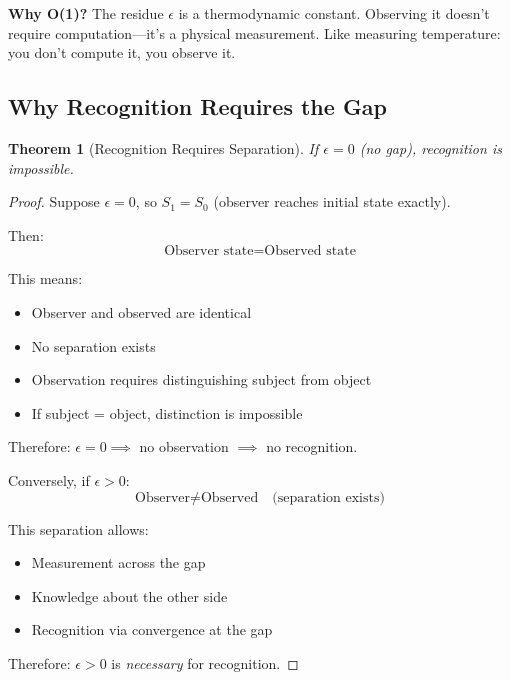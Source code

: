 \documentclass[twocolumn,10pt]{article}
\newtheorem{theorem}{Theorem}[section]
\theoremstyle{definition}
\theoremstyle{remark}
\begin{document}
\vspace{0.2cm}
\noindent\textbf{Why O(1)?} The residue $\epsilon$ is a thermodynamic constant. Observing it doesn't require computation—it's a physical measurement. Like measuring temperature: you don't compute it, you observe it.

\subsection{Why Recognition Requires the Gap}

\begin{theorem}[Recognition Requires Separation]
\label{thm:separation}
If $\epsilon = 0$ (no gap), recognition is impossible.
\end{theorem}

\begin{proof}
Suppose $\epsilon = 0$, so $S_1 = S_0$ (observer reaches initial state exactly).

Then:
\begin{equation}
\text{Observer state} = \text{Observed state}
\end{equation}

This means:
\begin{itemize}
\item Observer and observed are identical
\item No separation exists
\item Observation requires distinguishing subject from object
\item If subject = object, distinction is impossible
\end{itemize}

Therefore: $\epsilon = 0 \implies$ no observation $\implies$ no recognition.

\vspace{0.2cm}
\noindent Conversely, if $\epsilon > 0$:
\begin{equation}
\text{Observer} \neq \text{Observed} \quad \text{(separation exists)}
\end{equation}

This separation allows:
\begin{itemize}
\item Measurement across the gap
\item Knowledge about the other side
\item Recognition via convergence at the gap
\end{itemize}

Therefore: $\epsilon > 0$ is \textit{necessary} for recognition.
\end{proof}
\end{document}
